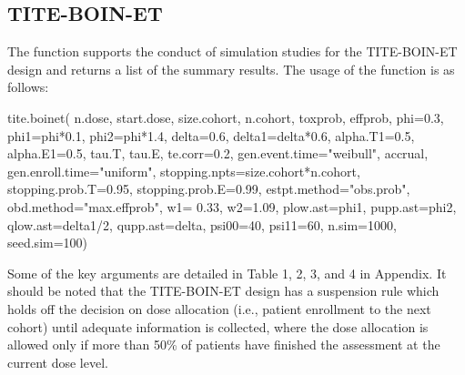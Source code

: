 \subsection{TITE-BOIN-ET}
The  function supports the conduct of simulation studies for the TITE-BOIN-ET design and returns a list of the summary results. The usage of the  function is as follows:
\begin{example}
tite.boinet(
  n.dose, start.dose, size.cohort, n.cohort,
  toxprob, effprob,
  phi=0.3, phi1=phi*0.1, phi2=phi*1.4, delta=0.6, delta1=delta*0.6,
  alpha.T1=0.5, alpha.E1=0.5, tau.T, tau.E,
  te.corr=0.2, gen.event.time="weibull",
  accrual, gen.enroll.time="uniform",
  stopping.npts=size.cohort*n.cohort,
  stopping.prob.T=0.95, stopping.prob.E=0.99,
  estpt.method="obs.prob", obd.method="max.effprob",
  w1= 0.33, w2=1.09,
  plow.ast=phi1, pupp.ast=phi2, qlow.ast=delta1/2, qupp.ast=delta,
  psi00=40, psi11=60,
  n.sim=1000, seed.sim=100)
\end{example}
Some of the key arguments are detailed in Table 1, 2, 3, and 4 in Appendix. It should be noted that the TITE-BOIN-ET design has a suspension rule which holds off the decision on dose allocation (i.e., patient enrollment to the next cohort) until adequate information is collected, where the dose allocation is allowed only if more than 50\% of patients have finished the assessment at the current dose level.

